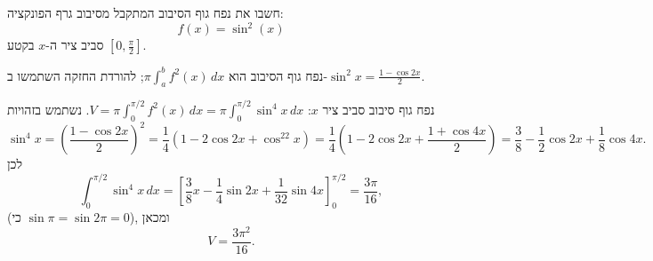 
\begin{question}
חשבו את נפח גוף הסיבוב המתקבל מסיבוב גרף הפונקציה:
\[ f(x)=\sin^2(x) \]
סביב ציר ה-$x$ בקטע $[0,\frac\pi2]$.
\end{question}

\begin{hint}
נפח גוף הסיבוב הוא $\pi\int_a^b f^2(x)\,dx$; להורדת החזקה השתמשו ב-$\sin^2x=\frac{1-\cos2x}{2}$.
\end{hint}

\begin{solution}
נפח גוף סיבוב סביב ציר $x$: $V=\pi\int_0^{\pi/2}f^2(x)\,dx=\pi\int_0^{\pi/2}\sin^4x\,dx$. נשתמש בזהויות
\[ \sin^4x=\left(\frac{1-\cos2x}{2}\right)^2=\frac14\left(1-2\cos2x+\cos^22x\right)=\frac14\left(1-2\cos2x+\frac{1+\cos4x}{2}\right)=\frac38-\frac12\cos2x+\frac18\cos4x. \]
לכן
\[ \int_0^{\pi/2}\sin^4x\,dx=\left[\frac38x-\frac14\sin2x+\frac1{32}\sin4x\right]_0^{\pi/2}=\frac{3\pi}{16}, \]
(כי $\sin\pi=\sin2\pi=0$), ומכאן
\[ \boxed{V=\frac{3\pi^2}{16}}. \]
\end{solution}
